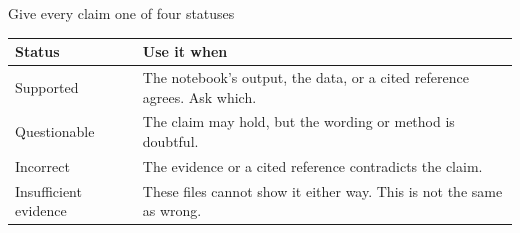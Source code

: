 \begin{frame}{Give every claim one of four statuses}
  \vfill
  \renewcommand{\arraystretch}{1.5}
  \begin{center}
    \small
    \begin{tabular}{@{}p{3.2cm}p{9.2cm}@{}}
      \toprule
      \textbf{Status} & \textbf{Use it when}\\
      \midrule
      Supported & The notebook's output, the data, or a cited reference agrees. Ask which.\\
      Questionable & The claim may hold, but the wording or method is doubtful.\\
      Incorrect & The evidence or a cited reference contradicts the claim.\\
      Insufficient evidence & These files cannot show it either way. This is not the same as wrong.\\
      \bottomrule
    \end{tabular}
  \end{center}
  \vspace{0.8em}
  \begin{center}
  \end{center}
  \vspace{1.6cm plus 1fill}
\end{frame}

